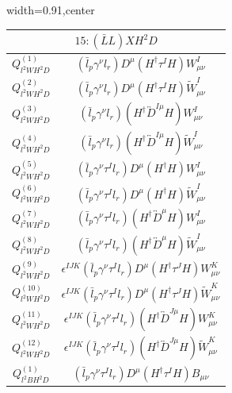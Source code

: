 \begin{table}[H]
\begin{center}
\begin{adjustbox}{width=0.91\textwidth,center}
\small
\begin{minipage}[t]{6.3cm}
\renewcommand{\arraystretch}{1.5}
\begin{tabular}[t]{c|c}
\multicolumn{2}{c}{\boldmath$15:(\bar L L)XH^2D$} \\
\hline
$Q_{l^2WH^2D}^{(1)}$  &  $(\bar{l}_p \gamma^\nu l_r) D^{\mu} (H^\dag \tau^I H) W_{\mu\nu}^I$ \\
%
$Q_{l^2WH^2D}^{(2)}$  &  $(\bar{l}_p \gamma^\nu l_r) D^{\mu} (H^\dag \tau^I H) \widetilde W_{\mu\nu}^I$ \\
%
$Q_{l^2WH^2D}^{(3)}$  &  $(\bar{l}_p \gamma^\nu l_r) (H^\dag \overleftrightarrow{D}^{I\mu} H) W_{\mu\nu}^I$ \\
%
$Q_{l^2WH^2D}^{(4)}$  &  $(\bar{l}_p \gamma^\nu l_r) (H^\dag \overleftrightarrow{D}^{I\mu} H) \widetilde W_{\mu\nu}^I$ \\
%
$Q_{l^2WH^2D}^{(5)}$  &  $(\bar{l}_p \gamma^\nu \tau^I l_r) D^{\mu} (H^\dag H) W_{\mu\nu}^I$ \\
%
$Q_{l^2WH^2D}^{(6)}$  &  $(\bar{l}_p \gamma^\nu \tau^I l_r) D^{\mu} (H^\dag H) \widetilde W_{\mu\nu}^I$ \\
%
$Q_{l^2WH^2D}^{(7)}$  &  $(\bar{l}_p \gamma^\nu \tau^I l_r) (H^\dag \overleftrightarrow{D}^\mu H) W_{\mu\nu}^I$ \\
%
$Q_{l^2WH^2D}^{(8)}$  &  $(\bar{l}_p \gamma^\nu \tau^I l_r) (H^\dag \overleftrightarrow{D}^\mu H) \widetilde W_{\mu\nu}^I$ \\
%
$Q_{l^2WH^2D}^{(9)}$  &  $\epsilon^{IJK} (\bar{l}_p \gamma^\nu \tau^I l_r) D^{\mu} (H^\dag \tau^J H) W_{\mu\nu}^K$ \\
%
$Q_{l^2WH^2D}^{(10)}$  &  $\epsilon^{IJK} (\bar{l}_p \gamma^\nu \tau^I l_r) D^{\mu} (H^\dag \tau^J H) \widetilde W_{\mu\nu}^K$ \\
%
$Q_{l^2WH^2D}^{(11)}$  &  $\epsilon^{IJK} (\bar{l}_p \gamma^\nu \tau^I l_r) (H^\dag \overleftrightarrow{D}^{J\mu} H) W_{\mu\nu}^K$ \\
%
$Q_{l^2WH^2D}^{(12)}$  &  $\epsilon^{IJK} (\bar{l}_p \gamma^\nu \tau^I l_r) (H^\dag \overleftrightarrow{D}^{J\mu} H) \widetilde W_{\mu\nu}^K$ \\
%
$Q_{l^2BH^2D}^{(1)}$  &  $(\bar{l}_p \gamma^\nu \tau^I l_r) D^{\mu} (H^\dag \tau^I H) B_{\mu\nu}$ \\

\end{tabular}
\end{minipage}
\end{adjustbox}
\end{center}
\end{table}
